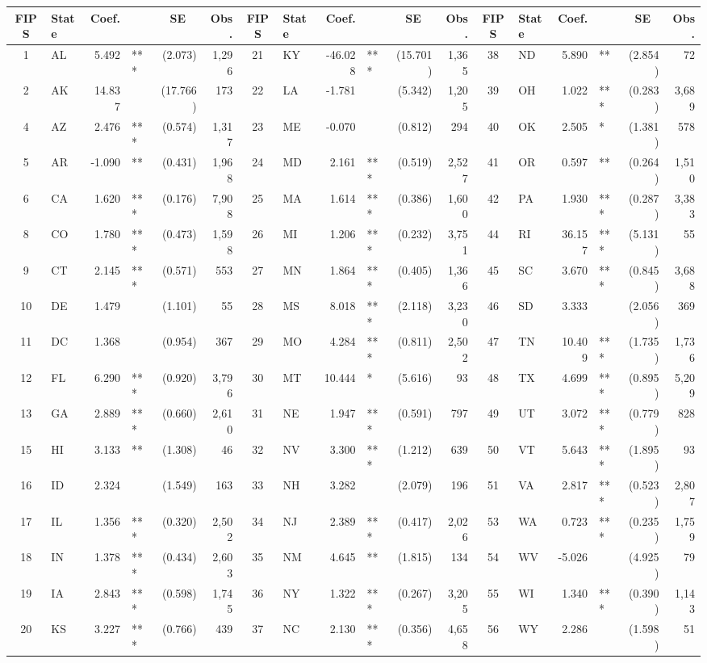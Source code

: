 \begin{tabular}{c l r l r r | c l r l r r | c l r l r r}
\hline
FIPS & State & Coef. & & \multicolumn{1}{c}{SE} & Obs. & FIPS & State & Coef. & & \multicolumn{1}{c}{SE} & Obs. & FIPS & State & Coef. & & \multicolumn{1}{c}{SE} & Obs. \\
\hline
1 & AL & 5.492 & *** & (2.073) & 1,296 & 21 & KY & -46.028 & *** & (15.701) & 1,365 & 38 & ND & 5.890 & ** & (2.854) & 72 \\
2 & AK & 14.837 &  & (17.766) & 173 & 22 & LA & -1.781 &  & (5.342) & 1,205 & 39 & OH & 1.022 & *** & (0.283) & 3,689 \\
4 & AZ & 2.476 & *** & (0.574) & 1,317 & 23 & ME & -0.070 &  & (0.812) & 294 & 40 & OK & 2.505 & * & (1.381) & 578 \\
5 & AR & -1.090 & ** & (0.431) & 1,968 & 24 & MD & 2.161 & *** & (0.519) & 2,527 & 41 & OR & 0.597 & ** & (0.264) & 1,510 \\
6 & CA & 1.620 & *** & (0.176) & 7,908 & 25 & MA & 1.614 & *** & (0.386) & 1,600 & 42 & PA & 1.930 & *** & (0.287) & 3,383 \\
8 & CO & 1.780 & *** & (0.473) & 1,598 & 26 & MI & 1.206 & *** & (0.232) & 3,751 & 44 & RI & 36.157 & *** & (5.131) & 55 \\
9 & CT & 2.145 & *** & (0.571) & 553 & 27 & MN & 1.864 & *** & (0.405) & 1,366 & 45 & SC & 3.670 & *** & (0.845) & 3,688 \\
10 & DE & 1.479 &  & (1.101) & 55 & 28 & MS & 8.018 & *** & (2.118) & 3,230 & 46 & SD & 3.333 &  & (2.056) & 369 \\
11 & DC & 1.368 &  & (0.954) & 367 & 29 & MO & 4.284 & *** & (0.811) & 2,502 & 47 & TN & 10.409 & *** & (1.735) & 1,736 \\
12 & FL & 6.290 & *** & (0.920) & 3,796 & 30 & MT & 10.444 & * & (5.616) & 93 & 48 & TX & 4.699 & *** & (0.895) & 5,209 \\
13 & GA & 2.889 & *** & (0.660) & 2,610 & 31 & NE & 1.947 & *** & (0.591) & 797 & 49 & UT & 3.072 & *** & (0.779) & 828 \\
15 & HI & 3.133 & ** & (1.308) & 46 & 32 & NV & 3.300 & *** & (1.212) & 639 & 50 & VT & 5.643 & *** & (1.895) & 93 \\
16 & ID & 2.324 &  & (1.549) & 163 & 33 & NH & 3.282 &  & (2.079) & 196 & 51 & VA & 2.817 & *** & (0.523) & 2,807 \\
17 & IL & 1.356 & *** & (0.320) & 2,502 & 34 & NJ & 2.389 & *** & (0.417) & 2,026 & 53 & WA & 0.723 & *** & (0.235) & 1,759 \\
18 & IN & 1.378 & *** & (0.434) & 2,603 & 35 & NM & 4.645 & ** & (1.815) & 134 & 54 & WV & -5.026 &  & (4.925) & 79 \\
19 & IA & 2.843 & *** & (0.598) & 1,745 & 36 & NY & 1.322 & *** & (0.267) & 3,205 & 55 & WI & 1.340 & *** & (0.390) & 1,143 \\
20 & KS & 3.227 & *** & (0.766) & 439 & 37 & NC & 2.130 & *** & (0.356) & 4,658 & 56 & WY & 2.286 &  & (1.598) & 51 \\
\hline
\end{tabular}
